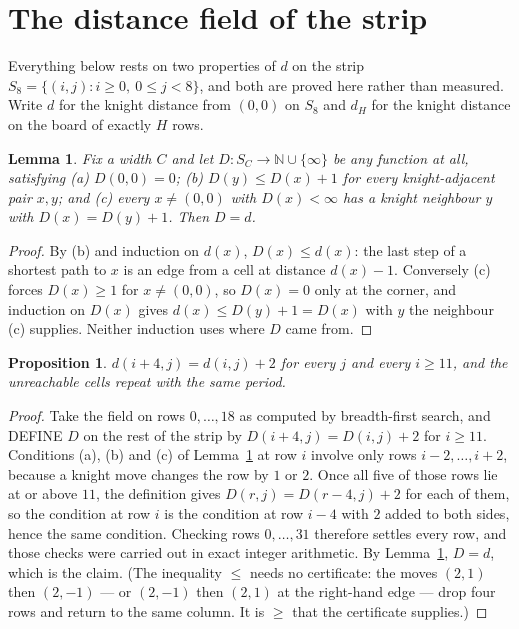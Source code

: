 \documentclass[11pt,a4paper]{article}
\theoremstyle{plain}
\newtheorem{lemma}[theorem]{Lemma}
\newtheorem{proposition}[theorem]{Proposition}
\theoremstyle{definition}
\begin{document}
\section{The distance field of the strip}

Everything below rests on two properties of $d$ on the strip $S_{8}=\{(i,j): i\ge 0,\ 0\le j<8\}$, and both are proved here rather than measured. Write $d$ for the knight distance from $(0,0)$ on $S_{8}$ and $d_H$ for the knight distance on the board of exactly $H$ rows.

\begin{lemma}\label{lem:bellman}
Fix a width $C$ and let $D:S_C\to\mathbb{N}\cup\{\infty\}$ be any function at all, satisfying
(a) $D(0,0)=0$; (b) $D(y)\le D(x)+1$ for every knight-adjacent pair $x,y$; and
(c) every $x\ne(0,0)$ with $D(x)<\infty$ has a knight neighbour $y$ with $D(x)=D(y)+1$. Then $D=d$.
\end{lemma}

\begin{proof}
By (b) and induction on $d(x)$, $D(x)\le d(x)$: the last step of a shortest path to $x$ is an edge from a cell at distance $d(x)-1$. Conversely (c) forces $D(x)\ge1$ for $x\ne(0,0)$, so $D(x)=0$ only at the corner, and induction on $D(x)$ gives $d(x)\le D(y)+1=D(x)$ with $y$ the neighbour (c) supplies. Neither induction uses where $D$ came from.
\end{proof}

\begin{proposition}\label{prop:period}
$d(i+4,j)=d(i,j)+2$ for every $j$ and every $i\ge11$, and the unreachable cells repeat with the same period.
\end{proposition}

\begin{proof}
Take the field on rows $0,\dots,18$ as computed by breadth-first search, and DEFINE $D$ on the rest of the strip by $D(i+4,j)=D(i,j)+2$ for $i\ge11$. Conditions (a), (b) and (c) of Lemma~\ref{lem:bellman} at row $i$ involve only rows $i-2,\dots,i+2$, because a knight move changes the row by $1$ or $2$. Once all five of those rows lie at or above $11$, the definition gives $D(r,j)=D(r-4,j)+2$ for each of them, so the condition at row $i$ is the condition at row $i-4$ with $2$ added to both sides, hence the same condition. Checking rows $0,\dots,31$ therefore settles every row, and those checks were carried out in exact integer arithmetic. By Lemma~\ref{lem:bellman}, $D=d$, which is the claim. (The inequality $\le$ needs no certificate: the moves $(2,1)$ then $(2,-1)$ --- or $(2,-1)$ then $(2,1)$ at the right-hand edge --- drop four rows and return to the same column. It is $\ge$ that the certificate supplies.)
\end{proof}
\end{document}
